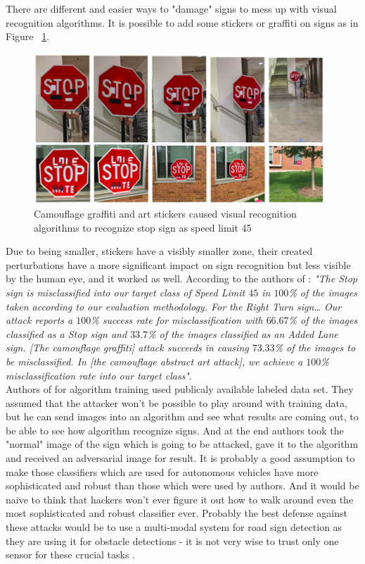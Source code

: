 There are different and easier ways to "damage" signs to mess up with visual recognition algorithms. It is possible to add some stickers or graffiti on signs as in  Figure ~\ref{fig:stickersigns}.

\begin{figure}[H]
	\centering  	
	\includegraphics[width=11cm]{img/stickerSign.png}
	\caption{Camouflage graffiti and art stickers caused visual recognition algorithms to recognize stop sign as speed limit 45 \cite{signs}}
	\label{fig:stickersigns}    
\end{figure}

Due to being smaller, stickers have a visibly smaller zone, their created perturbations have a more significant impact on sign recognition but less visible by the human eye, and it worked as well. According to the authors of \cite{signs}: \textit{"The Stop sign is misclassified into our target class of Speed Limit $45$ in $100$\% of the images taken according to our evaluation methodology. For the Right Turn sign… Our attack reports a $100$\% success rate for misclassification with $66.67$\% of the images classified as a Stop sign and $33.7$\% of the images classified as an Added Lane sign. [The camouflage graffiti] attack succeeds in causing $73.33$\% of the images to be misclassified. In [the camouflage abstract art attack], we achieve a $100$\% misclassification rate into our target class"}. \\
Authors of \cite{signs} for algorithm training used publicaly available labeled data set. They assumed that the attacker won't be possible to play around with training data, but he can send images into an algorithm and see what results are coming out, to be able to see how algorithm recognize signs. And at the end authors took the "normal" image of the sign which is going to be attacked, gave it to the algorithm and received an adversarial image for result. It is probably a good assumption to make those classifiers which are used for autonomous vehicles have more sophisticated and robust than those which were used by authors. And it would be naive to think that hackers won't ever figure it out how to walk around even the most sophisticated and robust classifier ever. Probably the best defense against these attacks would be to use a multi-modal system for road sign detection as they are using it for obstacle detections - it is not very wise to trust only one sensor for these crucial tasks \cite{signs2}.

